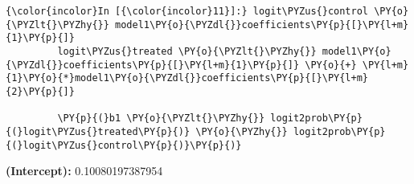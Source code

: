 
    \begin{Verbatim}[commandchars=\\\{\}]
{\color{incolor}In [{\color{incolor}11}]:} logit\PYZus{}control \PY{o}{\PYZlt{}\PYZhy{}} model1\PY{o}{\PYZdl{}}coefficients\PY{p}{[}\PY{l+m}{1}\PY{p}{]}
         logit\PYZus{}treated \PY{o}{\PYZlt{}\PYZhy{}} model1\PY{o}{\PYZdl{}}coefficients\PY{p}{[}\PY{l+m}{1}\PY{p}{]} \PY{o}{+} \PY{l+m}{1}\PY{o}{*}model1\PY{o}{\PYZdl{}}coefficients\PY{p}{[}\PY{l+m}{2}\PY{p}{]}
         
         \PY{p}{(}b1 \PY{o}{\PYZlt{}\PYZhy{}} logit2prob\PY{p}{(}logit\PYZus{}treated\PY{p}{)} \PY{o}{\PYZhy{}} logit2prob\PY{p}{(}logit\PYZus{}control\PY{p}{)}\PY{p}{)}
\end{Verbatim}


    \textbf{(Intercept):} 0.10080197387954
